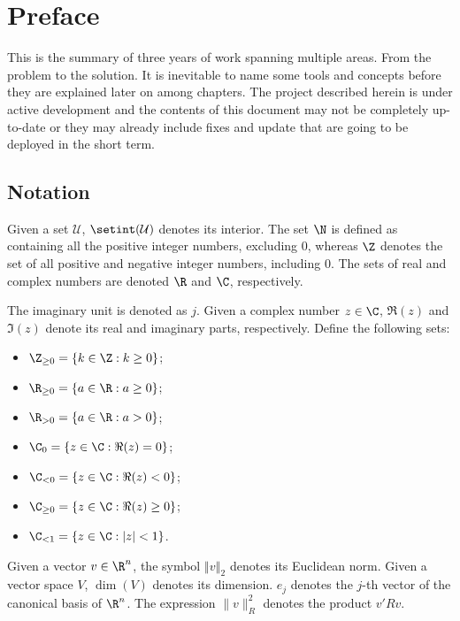 \chapter*{Preface}
\vspace{.7cm}
\doublespacing

{\color{red}This is the summary of three years of work spanning multiple areas. From the problem to the solution. It is inevitable to name some tools and concepts before they are explained later on among chapters. The project described herein is under active development and the contents of this document may not be completely up-to-date or they may already include fixes and update that are going to be deployed in the short term.}

\section*{Notation}
Given a set $\mathcal{U}$, $\setint(\mathcal{U})$ denotes its interior. The set $\N$ is defined as containing all the positive integer numbers, excluding $0$, whereas $\Z$ denotes the set of all positive and negative integer numbers, including $0$. The sets of real and complex numbers are denoted $\R$ and $\C$, respectively.

The imaginary unit is denoted as $j$.
Given a complex number $z\in\C$, $\Re(z)$ and $\Im(z)$ denote its real and imaginary parts, respectively.
Define the following sets:
\begin{itemize}
  \item $\Z_{\geq0}=\{k \in \Z:k\geq0\}$;
  \item $\R_{\geq0}=\{a \in \R:a\geq0\}$;
  \item $\R_{>0}=\{a \in \R:a>0\}$;
  \item $\C_0=\{z \in \C:\Re(z)=0\}$;
  \item $\C_{<0}=\{z \in \C:\Re(z)<0\}$;
  \item $\C_{\geq0}=\{z \in \C:\Re(z)\geq0\}$;
  \item $\C_{<1}=\{z \in \C:|z|<1\}$.
\end{itemize}

Given a vector $v\in\R^n$, the symbol $\left\Vert v \right\Vert_2$ denotes its Euclidean norm.
Given a vector space $V$, $\dim(V)$ denotes its dimension.
$e_j$ denotes the $j$-th vector of the canonical basis of	$\R^n$.
The expression $\|v\|^{2}_R$ denotes the product $v'Rv$.


